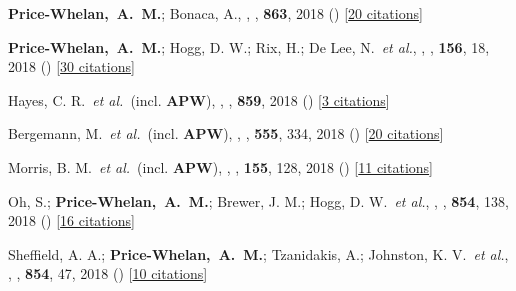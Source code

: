 \item[{\color{deemph}\scriptsize41}]\textbf{Price-Whelan,~A.~M.}; Bonaca, A., , \apj, \textbf{863}, 2018 () [\href{http://adsabs.harvard.edu/abs/2018ApJ...863L..20P}{20 citations}]

\item[{\color{deemph}\scriptsize40}]\textbf{Price-Whelan,~A.~M.}; Hogg, D. W.; Rix, H.; De Lee, N.~\textit{et al.}, , \aj, \textbf{156}, 18, 2018 () [\href{http://adsabs.harvard.edu/abs/2018AJ....156...18P}{30 citations}]

\item[{\color{deemph}\scriptsize39}]Hayes, C. R.~\textit{et al.}~(incl. \textbf{APW}), , \apj, \textbf{859}, 2018 () [\href{http://adsabs.harvard.edu/abs/2018ApJ...859L...8H}{3 citations}]

\item[{\color{deemph}\scriptsize38}]Bergemann, M.~\textit{et al.}~(incl. \textbf{APW}), , \nature, \textbf{555}, 334, 2018 () [\href{http://adsabs.harvard.edu/abs/2018Natur.555..334B}{20 citations}]

\item[{\color{deemph}\scriptsize37}]Morris, B. M.~\textit{et al.}~(incl. \textbf{APW}), , \aj, \textbf{155}, 128, 2018 () [\href{http://adsabs.harvard.edu/abs/2018AJ....155..128M}{11 citations}]

\item[{\color{deemph}\scriptsize36}]Oh, S.; \textbf{Price-Whelan,~A.~M.}; Brewer, J. M.; Hogg, D. W.~\textit{et al.}, , \apj, \textbf{854}, 138, 2018 () [\href{http://adsabs.harvard.edu/abs/2018ApJ...854..138O}{16 citations}]

\item[{\color{deemph}\scriptsize35}]Sheffield, A. A.; \textbf{Price-Whelan,~A.~M.}; Tzanidakis, A.; Johnston, K. V.~\textit{et al.}, , \apj, \textbf{854}, 47, 2018 () [\href{http://adsabs.harvard.edu/abs/2018ApJ...854...47S}{10 citations}]

